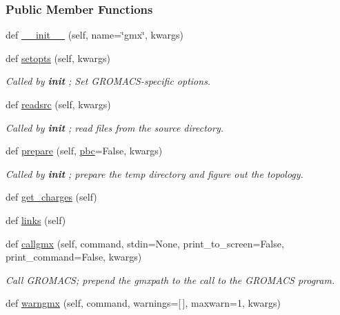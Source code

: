\subsubsection*{Public Member Functions}
\begin{DoxyCompactItemize}
\item 
def \hyperlink{classsrc_1_1gmxio_1_1GMX_aa29d0675a8429d93d3a9ebf5b9634c32}{\+\_\+\+\_\+init\+\_\+\+\_\+} (self, name=\char`\"{}gmx\char`\"{}, kwargs)
\item 
def \hyperlink{classsrc_1_1gmxio_1_1GMX_a585636f44e08bca144cadbe8755f37f2}{setopts} (self, kwargs)
\begin{DoxyCompactList}\small\item\em Called by {\bfseries init} ; Set G\+R\+O\+M\+A\+C\+S-\/specific options. \end{DoxyCompactList}\item 
def \hyperlink{classsrc_1_1gmxio_1_1GMX_a276bb887f884865956c49592b21d8f1f}{readsrc} (self, kwargs)
\begin{DoxyCompactList}\small\item\em Called by {\bfseries init} ; read files from the source directory. \end{DoxyCompactList}\item 
def \hyperlink{classsrc_1_1gmxio_1_1GMX_ab8b789bb8fb56f2cab0ba4dff7c5deb0}{prepare} (self, \hyperlink{classsrc_1_1gmxio_1_1GMX_a73bfde9773109c13b0f11eadd215cc1e}{pbc}=False, kwargs)
\begin{DoxyCompactList}\small\item\em Called by {\bfseries init} ; prepare the temp directory and figure out the topology. \end{DoxyCompactList}\item 
def \hyperlink{classsrc_1_1gmxio_1_1GMX_ab8c1d39bda1b3d7060b9348fe8a1b074}{get\+\_\+charges} (self)
\item 
def \hyperlink{classsrc_1_1gmxio_1_1GMX_a3f0267ba817464cc778e6fe4a50e8440}{links} (self)
\item 
def \hyperlink{classsrc_1_1gmxio_1_1GMX_a9cd8a8dde96ee479107dd2933922235d}{callgmx} (self, command, stdin=None, print\+\_\+to\+\_\+screen=False, print\+\_\+command=False, kwargs)
\begin{DoxyCompactList}\small\item\em Call G\+R\+O\+M\+A\+CS; prepend the gmxpath to the call to the G\+R\+O\+M\+A\+CS program. \end{DoxyCompactList}\item 
def \hyperlink{classsrc_1_1gmxio_1_1GMX_a24343e631722ec863df94641493128a9}{warngmx} (self, command, warnings=\mbox{[}$\,$\mbox{]}, maxwarn=1, kwargs)

\end{DoxyCompactItemize}
